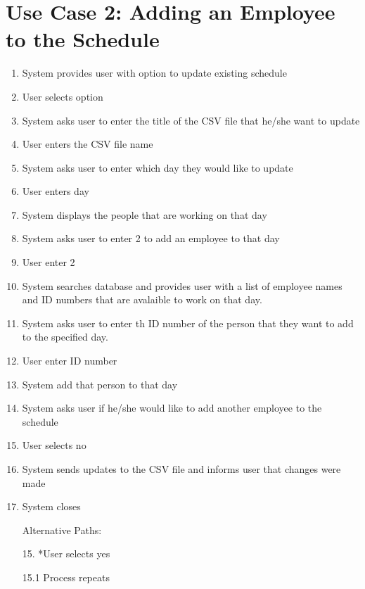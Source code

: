 \documentclass[12pt]{article}
\begin{document}
\section*{ Use Case 2: Adding an Employee to the Schedule}

\begin{enumerate}

\item
System provides user with option to update existing schedule

\item
User selects option

\item
System asks user to enter the title of the CSV file that he/she want to update

\item
User enters the CSV file name

\item
System asks user to enter which day they would like to update

\item
User enters day

\item
System displays the people that are working on that day

\item
System asks user to enter 2 to add an employee to that day

\item
User enter 2

\item
System searches database and provides user with a list of employee names and ID numbers that are avalaible to work on that day.

\item
System asks user to enter th ID number of the person that they want to add to the specified day.

\item
User enter ID number

\item
System add that person to that day

\item
System asks user if he/she would like to add another employee to the schedule

\item
User selects no

\item
System sends updates to the CSV file and informs user that changes were made

\item
System closes

Alternative Paths:

15. *User selects yes

15.1 Process repeats

\end{enumerate}
\end{document}
